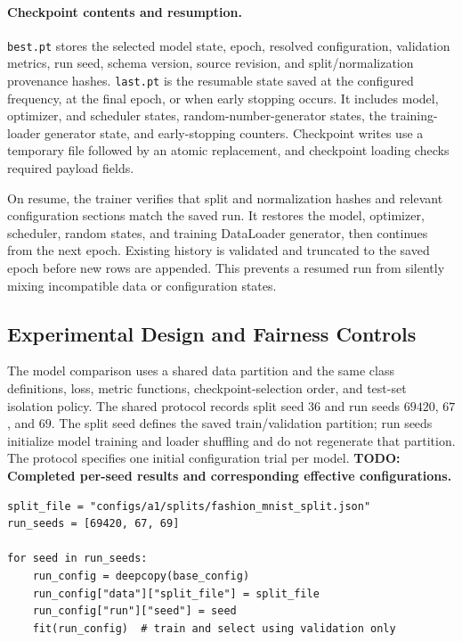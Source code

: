 \documentclass[11pt,a4paper]{article}
\begin{document}
\paragraph{Checkpoint contents and resumption.} \texttt{best.pt} stores the selected model state, epoch, resolved configuration, validation metrics, run seed, schema version, source revision, and split/normalization provenance hashes. \texttt{last.pt} is the resumable state saved at the configured frequency, at the final epoch, or when early stopping occurs. It includes model, optimizer, and scheduler states, random-number-generator states, the training-loader generator state, and early-stopping counters. Checkpoint writes use a temporary file followed by an atomic replacement, and checkpoint loading checks required payload fields.

On resume, the trainer verifies that split and normalization hashes and relevant configuration sections match the saved run. It restores the model, optimizer, scheduler, random states, and training DataLoader generator, then continues from the next epoch. Existing history is validated and truncated to the saved epoch before new rows are appended. This prevents a resumed run from silently mixing incompatible data or configuration states.

\subsection{Experimental Design and Fairness Controls}

The model comparison uses a shared data partition and the same class definitions, loss, metric functions, checkpoint-selection order, and test-set isolation policy. The shared protocol records split seed \(36\) and run seeds \(69420\), \(67\), and \(69\). The split seed defines the saved train/validation partition; run seeds initialize model training and loader shuffling and do not regenerate that partition. The protocol specifies one initial configuration trial per model. \textbf{TODO: Completed per-seed results and corresponding effective configurations.}

\begin{lstlisting}[caption={Fair-comparison outline: reuse one split, vary run seeds, and keep selection on validation.},label={lst:fairness}]
split_file = "configs/a1/splits/fashion_mnist_split.json"
run_seeds = [69420, 67, 69]

for seed in run_seeds:
    run_config = deepcopy(base_config)
    run_config["data"]["split_file"] = split_file
    run_config["run"]["seed"] = seed
    fit(run_config)  # train and select using validation only
\end{lstlisting}
\end{document}
